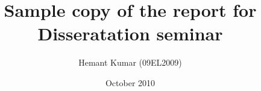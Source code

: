 \clearpage%

\title{Sample copy of the report for Disseratation seminar}
\author{Hemant Kumar (09EL2009)}

\date{October 2010}



\maketitle

